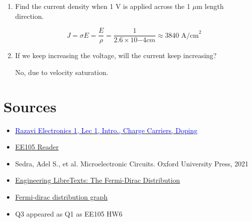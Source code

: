 \begin{enumerate}
\begin{enumerate}
            \item Find the current density when 1 V is applied across the 1 $\mu$m length direction.
            \begin{Ans}
                \[J = \sigma E = \frac{E}{\rho} = \frac{1}{2.6 \times 10{-4} cm} \approx 3840 \text{ A/cm}^2\]
            \end{Ans}

            \item If we keep increasing the voltage, will the current keep increasing?
            \begin{Ans}
                No, due to velocity saturation.
            \end{Ans}
        \end{enumerate}
    \end{enumerate}
\section{Sources}
\begin{itemize}
    \item \href{https://www.youtube.com/watch?v=yQDfVJzEymI}{\textcolor{blue}{Razavi Electronics 1, Lec 1, Intro., Charge Carriers, Doping}}
    \item \href{https://file.notion.so/f/f/048d6522-202b-48d4-b5d9-bc005bd602e2/214bf1f0-292f-48d6-9016-737d9f5da155/ee105_reader_v3.pdf?id=237a4300-3dbe-47d1-888b-ffae90d8352b&table=block&spaceId=048d6522-202b-48d4-b5d9-bc005bd602e2&expirationTimestamp=1714435200000&signature=yx-H1qvZJIodPfazOpwXX0Ce2mWMG8skOHl45xoPxus&downloadName=ee105_reader_v3.pdf}{EE105 Reader}
    \item Sedra, Adel S., et al. Microelectronic Circuits. Oxford University Press, 2021
    \item \href{https://eng.libretexts.org/Bookshelves/Materials_Science/TLP_Library_II/22%3A_Introduction_to_Semiconductors/22.2%3A_The_FermiDirac_Distribution}{Engineering LibreTexts: The Fermi-Dirac Distribution}
    \item \href{https://tex.stackexchange.com/questions/251496/fermi-dirac-in-pgfplots-dimension-too-lage}{Fermi-dirac distribution graph}
    \item Q3 appeared as Q1 as EE105 HW6
\end{itemize}

